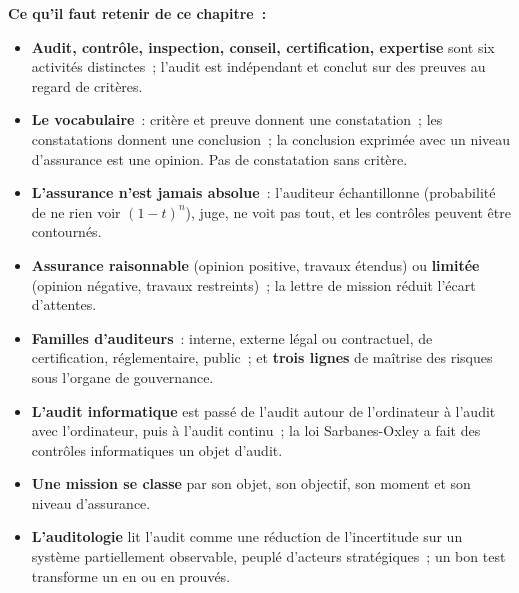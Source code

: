 \separateur

\begin{boxresume}
\textbf{Ce qu'il faut retenir de ce chapitre~:}
\begin{itemize}
    \item \textbf{Audit, contrôle, inspection, conseil, certification,
          expertise} sont six activités distinctes~; l'audit est
          indépendant et conclut sur des preuves au regard de critères.
    \item \textbf{Le vocabulaire}~: critère et preuve donnent une
          constatation~; les constatations donnent une conclusion~; la
          conclusion exprimée avec un niveau d'assurance est une opinion.
          Pas de constatation sans critère.
    \item \textbf{L'assurance n'est jamais absolue}~: l'auditeur
          échantillonne (probabilité de ne rien voir $(1-t)^n$), juge, ne
          voit pas tout, et les contrôles peuvent être contournés.
    \item \textbf{Assurance raisonnable} (opinion positive, travaux étendus)
          ou \textbf{limitée} (opinion négative, travaux restreints)~; la
          lettre de mission réduit l'écart d'attentes.
    \item \textbf{Familles d'auditeurs}~: interne, externe légal ou
          contractuel, de certification, réglementaire, public~; et
          \textbf{trois lignes} de maîtrise des risques sous l'organe de
          gouvernance.
    \item \textbf{L'audit informatique} est passé de l'audit autour de
          l'ordinateur à l'audit avec l'ordinateur, puis à l'audit continu~;
          la loi Sarbanes-Oxley a fait des contrôles informatiques un objet
          d'audit.
    \item \textbf{Une mission se classe} par son objet, son objectif, son
          moment et son niveau d'assurance.
    \item \textbf{L'auditologie} lit l'audit comme une réduction de
          l'incertitude sur un système partiellement observable, peuplé
          d'acteurs stratégiques~; un bon test transforme un \NEK{} en
          \OUI{} ou en \NON{} prouvés.
\end{itemize}
\end{boxresume}

